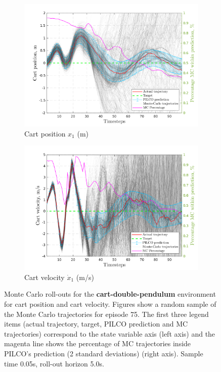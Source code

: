  \begin{figure}[htbp]    
    \begin{subfigure}[b]{1\linewidth}
    \centering
    \includegraphics[height=0.4\textheight,width=1\textwidth]{Chapter3/Figures/cdp_MC_rollout_Ep_80_Dim_1.png} 
    \caption{Cart position $x_1$ (m)} 
    \label{Fig:Re-cdp-cart-position} 
  \end{subfigure} 

  \begin{subfigure}[b]{1\linewidth}
    \centering
    \includegraphics[height=0.4\textheight,width=1\textwidth]{Chapter3/Figures/cdp_MC_rollout_Ep_80_Dim_2.png} 
    \caption{Cart velocity $\dot{x}_1$ (m/s)} 
    \label{Fig:Re-cdp-cart-velocity} 
  \end{subfigure} 
\caption[Monte Carlo roll-outs for \textbf{cart-double-pendulum} cart position and cart velocity]{Monte Carlo roll-outs for the \textbf{cart-double-pendulum} environment for cart position and cart velocity. Figures show a random sample of the Monte Carlo trajectories for episode 75. The first three legend items (actual trajectory, target, PILCO prediction and MC trajectories) correspond to the state variable axis (left axis) and the magenta line shows the percentage of MC trajectories inside PILCO's prediction (2 standard deviations) (right axis). Sample time 0.05s, roll-out horizon 5.0s.}
\label{Fig:Re-cdp-MC-roll-outs-1} 
\end{figure}
 
